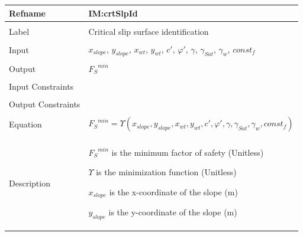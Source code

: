 \documentclass[12pt]{article}
\begin{document}
\noindent \begin{minipage}{\textwidth}
\begin{tabular}{p{} p{}}
\toprule \textbf{Refname} & \textbf{IM:crtSlpId}
\label{IM:crtSlpId}
\\ \midrule \\
Label & Critical slip surface identification
        \\ \midrule \\
        Input & ${x_{slope}}$, ${y_{slope}}$, ${x_{wt}}$, ${y_{wt}}$, $c'$, $φ'$, $γ$, ${γ_{Sat}}$, ${γ_{w}}$, $const_f$
                \\ \midrule \\
                Output & ${{F_{S}}^{min}}$
                         \\ \midrule \\
                         Input Constraints & \\ \midrule \\
                                             Output Constraints & \\ \midrule \\
                                                                  Equation & \begin{displaymath}
                                                                             {{F_{S}}^{min}}=Υ\left({x_{slope}},{y_{slope}},{x_{wt}},{y_{wt}},c',φ',γ,{γ_{Sat}},{γ_{w}},const_f\right)
                                                                             \end{displaymath}
                                                                             \\ \midrule \\
                                                                             Description & \begin{symbDescription}
                                                                                           \item{${{F_{S}}^{min}}$ is the minimum factor of safety (Unitless)}
                                                                                           \item{$Υ$ is the minimization function (Unitless)}
                                                                                           \item{${x_{slope}}$ is the x-coordinate of the slope (m)}
                                                                                           \item{${y_{slope}}$ is the y-coordinate of the slope (m)}

\end{symbDescription}
\end{tabular}
\end{minipage}
\end{document}

